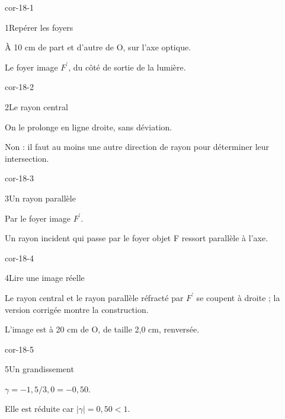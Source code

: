 \clearpage{}
\corrigesSouples
\begin{blocLivre}{cor-18-1}\begin{corrige}{1}{Repérer les foyers}
\begin{questions}
\item À 10 cm de part et d’autre de O, sur l’axe optique.
\item Le foyer image $F^{\prime}$, du côté de sortie de la lumière.
\end{questions}
\end{corrige}\end{blocLivre}
\begin{blocLivre}{cor-18-2}\begin{corrige}{2}{Le rayon central}
\begin{questions}
\item On le prolonge en ligne droite, sans déviation.
\item Non : il faut au moins une autre direction de rayon pour déterminer leur intersection.
\end{questions}
\end{corrige}\end{blocLivre}
\begin{blocLivre}{cor-18-3}\begin{corrige}{3}{Un rayon parallèle}
\begin{questions}
\item Par le foyer image $F^{\prime}$.
\item Un rayon incident qui passe par le foyer objet F ressort parallèle à l’axe.
\end{questions}
\end{corrige}\end{blocLivre}
\begin{blocLivre}{cor-18-4}\begin{corrige}{4}{Lire une image réelle}
\begin{questions}
\item Le rayon central et le rayon parallèle réfracté par $F^{\prime}$ se coupent à droite ; la version corrigée montre la construction.
\item L’image est à 20 cm de O, de taille 2,0 cm, renversée.
\end{questions}
\end{corrige}\end{blocLivre}
\begin{blocLivre}{cor-18-5}\begin{corrige}{5}{Un grandissement}
\begin{questions}
\item $\gamma=-1,5/3,0=-0,50$.
\item Elle est réduite car $|\gamma|=0,50<1$.
\end{questions}
\end{corrige}\end{blocLivre}
